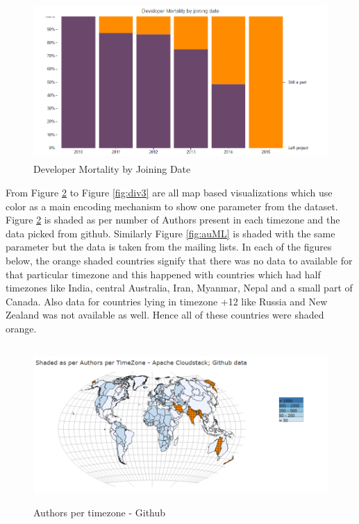 \documentclass[seploa]{beavtex}
\begin{document}
\begin{figure}[H]
\centering
\includegraphics[width=130mm,height=60mm]{image3.PNG}
\caption{Developer Mortality by Joining Date}
\label{fig:devMort}
\end{figure}

From Figure \ref{fig:auHub} to Figure \ref{fig:div3} are all map based visualizations which use color as a main encoding mechanism to show one parameter from the dataset. Figure \ref{fig:auHub} is shaded as per number of Authors present in each timezone and the data picked from github. Similarly Figure \ref{fig:auML} is shaded with the same parameter but the data is taken from the mailing lists. In each of the figures below, the orange shaded countries signify that there was no data to available for that particular timezone and this happened with countries which had half timezones like India, central Australia, Iran, Myanmar, Nepal and a small part of Canada. Also data for countries lying in timezone +12 like Russia and New Zealand was not available as well. Hence all of these countries were shaded orange.

\begin{figure}[H]
\centering
\includegraphics[width=130mm,height=60mm]{image4.PNG}
\caption{Authors per timezone - Github}
\label{fig:auHub}
\end{figure}
\end{document}
